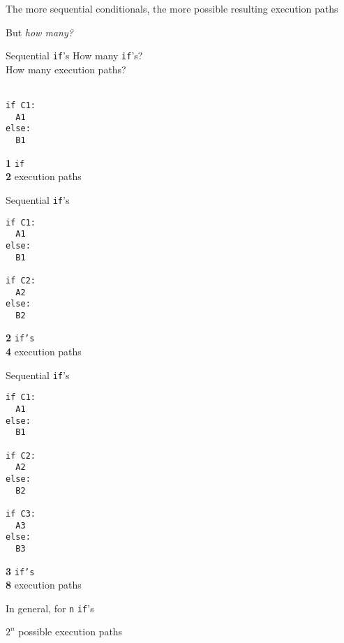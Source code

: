 \documentclass{beamer}
\begin{document}
\begin{slide}{
\item The more sequential conditionals, the more possible resulting execution paths
\item But \textit{how many?}
}\end{slide}

\begin{frame}[fragile]{Sequential \texttt{if}'s}
How many \texttt{if}'s? \\ 
How many execution paths? \\ \ \\

\begin{lstlisting}[frame=shadowbox,basicstyle=\ttfamily\tiny]
if C1:
  A1
else:
  B1
\end{lstlisting}

\pause

\textbf{1} \texttt{if} \\
\textbf{2} execution paths \\
\end{frame}

\begin{frame}[fragile]{Sequential \texttt{if}'s}
\begin{lstlisting}[frame=shadowbox,basicstyle=\ttfamily\tiny]
if C1:
  A1
else:
  B1

if C2:
  A2
else:
  B2
\end{lstlisting}

\pause

\textbf{2} \texttt{if's} \\
\textbf{4} execution paths \\
\end{frame}

\begin{frame}[fragile]{Sequential \texttt{if}'s}
\begin{lstlisting}[frame=shadowbox,basicstyle=\ttfamily\tiny]
if C1:
  A1
else:
  B1

if C2:
  A2
else:
  B2

if C3:
  A3
else:
  B3
\end{lstlisting}

\pause

\textbf{3} \texttt{if's} \\
\textbf{8} execution paths \\
\end{frame}

\begin{slide}{
\item In general, for \texttt{n} \texttt{if}'s
\item $2^n$ possible execution paths 
}\end{slide}
\end{document}

